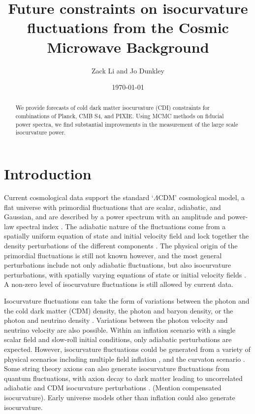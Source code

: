 \documentclass{emulateapj}
\newcommand{\LCDM}   {$\Lambda$CDM}
\begin{document}
\title{Future constraints on isocurvature fluctuations from the Cosmic Microwave Background}
\author{Zack Li and Jo Dunkley}
\date{\today}
{}


\begin{abstract}
We provide forecasts of cold dark matter isocurvature (CDI) constraints for combinations of Planck, CMB S4, and PIXIE. Using MCMC methods on fiducial power spectra, we find substantial improvements in the measurement of the large scale isocurvature power.
\end{abstract}

\section{Introduction}

Current cosmological data support the standard `\LCDM' cosmological model, a flat universe with primordial fluctuations that are scalar, adiabatic, and Gaussian, and are described by a power spectrum with an amplitude and power-law spectral index \citep{planckXX:2015}. The adiabatic nature of the fluctuations come from a spatially uniform equation of state and initial velocity field and lock together the density perturbations of the different components \citep{planckXXII:2013}. The physical origin of the primordial fluctuations is still not known however, and the most general perturbations include not only adiabatic fluctuations, but also isocurvature perturbations, with spatially varying equations of state or initial velocity fields \citep{adiab}. A non-zero level of isocurvature fluctuations is still allowed by current data.

Isocurvature fluctuations can take the form of variations between the photon and the cold dark matter (CDM) density, the photon and baryon density, or the photon and neutrino density \citep{moodley/bucher/turok:2000}. Variations between the photon velocity and neutrino velocity are also possible. Within an inflation scenario with a single scalar field and slow-roll initial conditions, only adiabatic perturbations are expected. However, isocurvature fluctuations could be generated from a variety of physical scenarios including multiple field inflation \citep{langlois:1999}, and the curvaton scenario
\citep{baumann/etal:2009}. Some string theory axions can also generate isocurvature fluctuations from quantum fluctuations, with axion decay to dark matter leading to uncorrelated adiabatic and CDM isocurvature perturbations \cite{axion}. (Mention compensated isocurvature). Early universe models other than inflation could also generate isocurvature.
\end{document}
